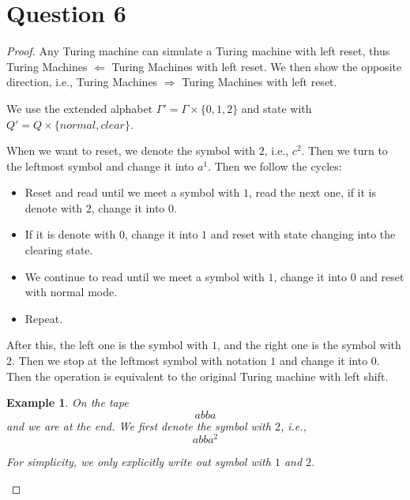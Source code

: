 \documentclass[a4paper, UTF-8]{article}
\theoremstyle{plain}
\newtheorem{example}{\indent Example}[section]
\begin{document}
\section{Question 6} 

\begin{proof}

Any Turing machine can simulate a Turing machine with left reset, thus Turing Machines $\Leftarrow$ Turing Machines with left reset. We then show the opposite direction, i.e., Turing Machines $\Rightarrow$ Turing Machines with left reset.

We use the extended alphabet $\Gamma' = \Gamma \times \{0, 1, 2\}$ and state with $Q' = Q \times \{normal, clear\}$. 

When we want to reset, we denote the symbol with $2$, i.e., $c^2$. Then we turn to the leftmost symbol and change it into $a^1$. Then we follow the cycles: 
\begin{itemize}
    \item Reset and read until we meet a symbol with $1$, read the next one, if it is denote with $2$, change it into $0$.
    \item If it is denote with $0$, change it into $1$ and reset with state changing into the clearing state. 
    \item We continue to read until we meet a symbol with $1$, change it into $0$ and reset with normal mode. 
    \item Repeat. 
\end{itemize}

After this, the left one is the symbol with $1$, and the right one is the symbol with $2$. Then we stop at the leftmost symbol with notation $1$ and change it into $0$. Then the operation is equivalent to the original Turing machine with left shift.

\begin{example}
On the tape 
$$
abba
$$
and we are at the end. We first denote the symbol with $2$, i.e.,
$$
abba^2
$$

For simplicity, we only explicitly write out symbol with $1$ and $2$.


\end{example}
\end{proof}
\end{document}

